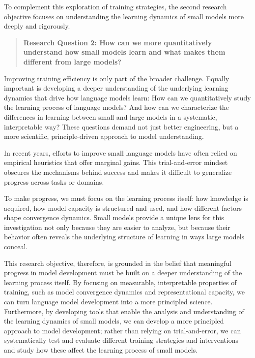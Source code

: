 To complement this exploration of training strategies, the second research objective focuses on understanding the learning dynamics of small models more deeply and rigorously.

\begin{quote}
    \textbf{Research Question 2: How can we more quantitatively understand how small models learn and what makes them different from large models?}
\end{quote}

Improving training efficiency is only part of the broader challenge. Equally important is developing a deeper understanding of the underlying learning dynamics that drive how language models learn: How can we quantitatively study the learning process of language models? And how can we characterize the differences in learning between small and large models in a systematic, interpretable way? These questions demand not just better engineering, but a more scientific, principle-driven approach to model understanding.

In recent years, efforts to improve small language models have often relied on empirical heuristics that offer marginal gains. This trial-and-error mindset obscures the mechanisms behind success and makes it difficult to generalize progress across tasks or domains. 

To make progress, we must focus on the learning process itself: how knowledge is acquired, how model capacity is structured and used, and how different factors shape convergence dynamics. Small models provide a unique lens for this investigation not only because they are easier to analyze, but because their behavior often reveals the underlying structure of learning in ways large models conceal.

This research objective, therefore, is grounded in the belief that meaningful progress in model development must be built on a deeper understanding of the learning process itself. By focusing on measurable, interpretable properties of training, such as model convergence dynamics and representational capacity, we can turn language model development into a more principled science. Furthermore, by developing tools that enable the analysis and understanding of the learning dynamics of small models, we can develop a more principled approach to model development; rather than relying on trial-and-error, we can systematically test and evaluate different training strategies and interventions and study how these affect the learning process of small models.

